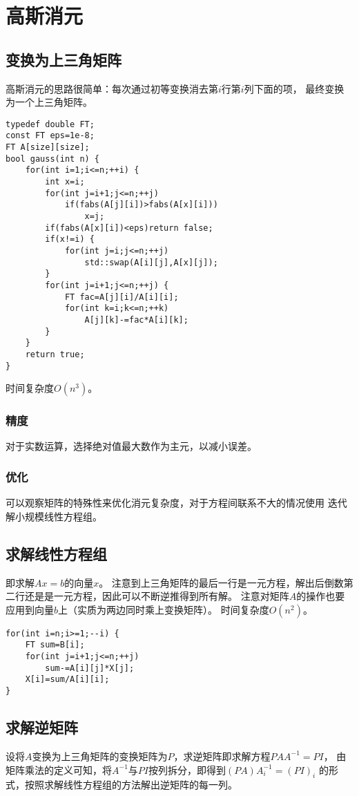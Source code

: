 \section{高斯消元}
\subsection{变换为上三角矩阵}
高斯消元的思路很简单：每次通过初等变换消去第$i$行第$i$列下面的项，
最终变换为一个上三角矩阵。
\begin{lstlisting}[title=gauss]
typedef double FT;
const FT eps=1e-8;
FT A[size][size];
bool gauss(int n) {
    for(int i=1;i<=n;++i) {
        int x=i;
        for(int j=i+1;j<=n;++j)
            if(fabs(A[j][i])>fabs(A[x][i]))
                x=j;
        if(fabs(A[x][i])<eps)return false;
        if(x!=i) {
            for(int j=i;j<=n;++j)
                std::swap(A[i][j],A[x][j]);
        }
        for(int j=i+1;j<=n;++j) {
            FT fac=A[j][i]/A[i][i];
            for(int k=i;k<=n;++k)
                A[j][k]-=fac*A[i][k];
        }
    }
    return true;
}
\end{lstlisting}
时间复杂度$O(n^3)$。
\subsubsection{精度}
对于实数运算，选择绝对值最大数作为主元，以减小误差。
\subsubsection{优化}
可以观察矩阵的特殊性来优化消元复杂度，对于方程间联系不大的情况使用
迭代解小规模线性方程组。
\subsection{求解线性方程组}\label{LSE}
即求解$Ax=b$的向量$x$。
注意到上三角矩阵的最后一行是一元方程，解出后倒数第二行还是是一元方程，因此可以不断逆推得到所有解。
注意对矩阵$A$的操作也要应用到向量$b$上（实质为两边同时乘上变换矩阵）。
时间复杂度$O(n^2)$。
\begin{lstlisting}
for(int i=n;i>=1;--i) {
    FT sum=B[i];
    for(int j=i+1;j<=n;++j)
        sum-=A[i][j]*X[j];
    X[i]=sum/A[i][i];
}
\end{lstlisting}
\subsection{求解逆矩阵}\label{InvMatGauss}
设将$A$变换为上三角矩阵的变换矩阵为$P$，求逆矩阵即求解方程$PAA^{-1}=PI$，
由矩阵乘法的定义可知，将$A^{-1}$与$PI$按列拆分，即得到$(PA)A_i^{-1}=(PI)_i$
的形式，按照求解线性方程组的方法解出逆矩阵的每一列。

